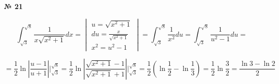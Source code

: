 \documentclass{article}
\begin{document}
\textbf{№ 21} 

$$ \int_{\sqrt{3}}^{\sqrt{8}} \frac{1}{x\sqrt{x^2+1}} dx 
= \begin{vmatrix} u = \sqrt{x^2+1} \\
                 du = \frac{x}{\sqrt{x^2+1}} \\
                x^2 = u^2-1 \end{vmatrix} 
= \int_{\sqrt{3}}^{\sqrt{8}} \frac{1}{x^2}du 
= \int_{\sqrt{3}}^{\sqrt{8}} \frac{1}{u^2-1}du 
= $$

$$ = \frac{1}{2} \ln{\left| \frac{u-1}{u+1} \right|} \bigg\vert_{\sqrt{3}}^{\sqrt{8}}
= \frac{1}{2} \ln{\left| \frac{\sqrt{x^2+1}-1}{\sqrt{x^2+1}+1} \right|} \bigg\vert_{\sqrt{3}}^{\sqrt{8}} 
= \frac{1}{2} \left( \ln{\frac{1}{2}} - \ln{\frac{1}{3}} \right)
= \frac{1}{2} \ln{\frac{3}{2}} 
= \frac{\ln{3}-\ln{2}}{2}  $$
\end{document}
